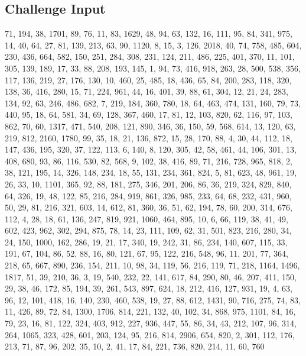 \subsection{Challenge Input}\label{challenge-input-12}

71, 194, 38, 1701, 89, 76, 11, 83, 1629, 48, 94, 63, 132, 16, 111, 95,
84, 341, 975, 14, 40, 64, 27, 81, 139, 213, 63, 90, 1120, 8, 15, 3, 126,
2018, 40, 74, 758, 485, 604, 230, 436, 664, 582, 150, 251, 284, 308,
231, 124, 211, 486, 225, 401, 370, 11, 101, 305, 139, 189, 17, 33, 88,
208, 193, 145, 1, 94, 73, 416, 918, 263, 28, 500, 538, 356, 117, 136,
219, 27, 176, 130, 10, 460, 25, 485, 18, 436, 65, 84, 200, 283, 118,
320, 138, 36, 416, 280, 15, 71, 224, 961, 44, 16, 401, 39, 88, 61, 304,
12, 21, 24, 283, 134, 92, 63, 246, 486, 682, 7, 219, 184, 360, 780, 18,
64, 463, 474, 131, 160, 79, 73, 440, 95, 18, 64, 581, 34, 69, 128, 367,
460, 17, 81, 12, 103, 820, 62, 116, 97, 103, 862, 70, 60, 1317, 471,
540, 208, 121, 890, 346, 36, 150, 59, 568, 614, 13, 120, 63, 219, 812,
2160, 1780, 99, 35, 18, 21, 136, 872, 15, 28, 170, 88, 4, 30, 44, 112,
18, 147, 436, 195, 320, 37, 122, 113, 6, 140, 8, 120, 305, 42, 58, 461,
44, 106, 301, 13, 408, 680, 93, 86, 116, 530, 82, 568, 9, 102, 38, 416,
89, 71, 216, 728, 965, 818, 2, 38, 121, 195, 14, 326, 148, 234, 18, 55,
131, 234, 361, 824, 5, 81, 623, 48, 961, 19, 26, 33, 10, 1101, 365, 92,
88, 181, 275, 346, 201, 206, 86, 36, 219, 324, 829, 840, 64, 326, 19,
48, 122, 85, 216, 284, 919, 861, 326, 985, 233, 64, 68, 232, 431, 960,
50, 29, 81, 216, 321, 603, 14, 612, 81, 360, 36, 51, 62, 194, 78, 60,
200, 314, 676, 112, 4, 28, 18, 61, 136, 247, 819, 921, 1060, 464, 895,
10, 6, 66, 119, 38, 41, 49, 602, 423, 962, 302, 294, 875, 78, 14, 23,
111, 109, 62, 31, 501, 823, 216, 280, 34, 24, 150, 1000, 162, 286, 19,
21, 17, 340, 19, 242, 31, 86, 234, 140, 607, 115, 33, 191, 67, 104, 86,
52, 88, 16, 80, 121, 67, 95, 122, 216, 548, 96, 11, 201, 77, 364, 218,
65, 667, 890, 236, 154, 211, 10, 98, 34, 119, 56, 216, 119, 71, 218,
1164, 1496, 1817, 51, 39, 210, 36, 3, 19, 540, 232, 22, 141, 617, 84,
290, 80, 46, 207, 411, 150, 29, 38, 46, 172, 85, 194, 39, 261, 543, 897,
624, 18, 212, 416, 127, 931, 19, 4, 63, 96, 12, 101, 418, 16, 140, 230,
460, 538, 19, 27, 88, 612, 1431, 90, 716, 275, 74, 83, 11, 426, 89, 72,
84, 1300, 1706, 814, 221, 132, 40, 102, 34, 868, 975, 1101, 84, 16, 79,
23, 16, 81, 122, 324, 403, 912, 227, 936, 447, 55, 86, 34, 43, 212, 107,
96, 314, 264, 1065, 323, 428, 601, 203, 124, 95, 216, 814, 2906, 654,
820, 2, 301, 112, 176, 213, 71, 87, 96, 202, 35, 10, 2, 41, 17, 84, 221,
736, 820, 214, 11, 60, 760

